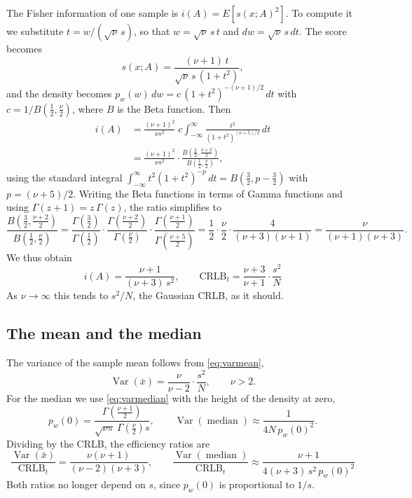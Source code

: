 \documentclass[11pt]{article}
\numberwithin{figure}{section}
\numberwithin{equation}{section}
\begin{document}
The Fisher information of one sample is $i(A) = E[s(x;A)^2]$. To compute it we substitute
$t = w/(\sqrt{\nu}\,s)$, so that $w = \sqrt{\nu}\,s\,t$ and $dw = \sqrt{\nu}\,s\,dt$. The score becomes
\[
  s(x; A) = \frac{(\nu+1)\,t}{\sqrt{\nu}\,s\,(1 + t^2)},
\]
and the density becomes $p_w(w)\,dw = c\,(1 + t^2)^{-(\nu+1)/2}\,dt$ with
$c = 1/B\!\left(\tfrac12, \tfrac{\nu}{2}\right)$, where $B$ is the Beta function. Then
\begin{align*}
  i(A) &= \frac{(\nu+1)^2}{\nu s^2}\; c \int_{-\infty}^{\infty} \frac{t^2}{(1+t^2)^{(\nu+5)/2}}\,dt \\
  &= \frac{(\nu+1)^2}{\nu s^2}\cdot\frac{B\!\left(\tfrac32, \tfrac{\nu+2}{2}\right)}{B\!\left(\tfrac12, \tfrac{\nu}{2}\right)},
\end{align*}
using the standard integral $\int_{-\infty}^{\infty} t^2 (1+t^2)^{-p}\,dt = B\!\left(\tfrac32, p - \tfrac32\right)$
with $p = (\nu+5)/2$. Writing the Beta functions in terms of Gamma functions and using
$\Gamma(z+1) = z\,\Gamma(z)$, the ratio simplifies to
\[
  \frac{B\!\left(\tfrac32, \tfrac{\nu+2}{2}\right)}{B\!\left(\tfrac12, \tfrac{\nu}{2}\right)}
  = \frac{\Gamma(\tfrac32)}{\Gamma(\tfrac12)}\cdot\frac{\Gamma(\tfrac{\nu+2}{2})}{\Gamma(\tfrac{\nu}{2})}
  \cdot\frac{\Gamma(\tfrac{\nu+1}{2})}{\Gamma(\tfrac{\nu+5}{2})}
  = \frac12\cdot\frac{\nu}{2}\cdot\frac{4}{(\nu+3)(\nu+1)}
  = \frac{\nu}{(\nu+1)(\nu+3)}.
\]
We thus obtain
\[
  i(A) = \frac{\nu + 1}{(\nu + 3)\,s^2}, \qquad
  \boxed{\text{CRLB}_t = \frac{\nu + 3}{\nu + 1}\cdot\frac{s^2}{N}}
\]
As $\nu \to \infty$ this tends to $s^2/N$, the Gaussian CRLB, as it should.

\subsection{The mean and the median}

The variance of the sample mean follows from \eqref{eq:varmean},
\[
  \operatorname{Var}(\bar x) = \frac{\nu}{\nu - 2}\cdot\frac{s^2}{N}, \qquad \nu > 2.
\]
For the median we use \eqref{eq:varmedian} with the height of the density at zero,
\[
  p_w(0) = \frac{\Gamma\!\left(\frac{\nu+1}{2}\right)}{\sqrt{\nu\pi}\,\Gamma\!\left(\frac{\nu}{2}\right)s},
  \qquad
  \operatorname{Var}(\operatorname{median}) \approx \frac{1}{4N\,p_w(0)^2}.
\]
Dividing by the CRLB, the efficiency ratios are
\[
  \boxed{\frac{\operatorname{Var}(\bar x)}{\text{CRLB}_t} = \frac{\nu(\nu+1)}{(\nu-2)(\nu+3)}},
  \qquad
  \boxed{\frac{\operatorname{Var}(\operatorname{median})}{\text{CRLB}_t} \approx \frac{\nu + 1}{4(\nu+3)\,s^2\,p_w(0)^2}}
\]
Both ratios no longer depend on $s$, since $p_w(0)$ is proportional to $1/s$.
\end{document}
